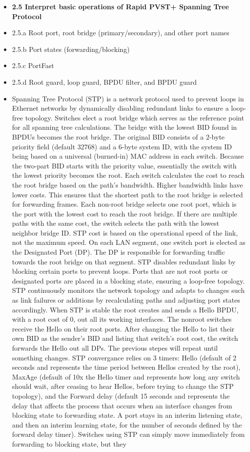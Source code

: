 \documentclass{article}
\begin{document}
\begin{itemize}
  \item \textbf{2.5 Interpret basic operations of Rapid PVST+ Spanning Tree Protocol}
  	\item 2.5.a Root port, root bridge (primary/secondary), and other port names
  	\item 2.5.b Port states (forwarding/blocking)
  	\item 2.5.c PortFast
  	\item 2.5.d Root guard, loop guard, BPDU filter, and BPDU guard
  	\item[] Spanning Tree Protocol (STP) is a network protocol used to prevent loops in Ethernet networks by dynamically disabling redundant links to ensure a loop-free topology. Switches elect a root bridge which serves as the reference point for all spanning tree calculations. The bridge with the lowest BID found in BPDUs becomes the root bridge. The original BID consists of a 2-byte priority field (default 32768) and a 6-byte system ID, with the system ID being based on a universal (burned-in) MAC address in each switch. Because the two-part BID starts with the priority value, essentially the switch with the lowest priority becomes the root. Each switch calculates the cost to reach the root bridge based on the path's bandwidth. Higher bandwidth links have lower costs. This ensures that the shortest path to the root bridge is selected for forwarding frames. Each non-root bridge selects one root port, which is the port with the lowest cost to reach the root bridge. If there are multiple paths with the same cost, the switch selects the path with the lowest neighbor bridge ID. STP cost is based on the operational speed of the link, not the maximum speed. On each LAN segment, one switch port is elected as the Designated Port (DP). The DP is responsible for forwarding traffic towards the root bridge on that segment. STP disables redundant links by blocking certain ports to prevent loops. Ports that are not root ports or designated ports are placed in a blocking state, ensuring a loop-free topology. STP continuously monitors the network topology and adapts to changes such as link failures or additions by recalculating paths and adjusting port states accordingly. When STP is stable the root creates and sends a Hello BPDU, with a root cost of 0, out all its working interfaces. The nonroot switches receive the Hello on their root ports. After changing the Hello to list their own BID as the sender's BID and listing that switch's root cost, the switch forwards the Hello out all DPs. The previous stepes will repeat until something changes. STP convergance relies on 3 timers: Hello (default of 2 seconds and represents the time period between Hellos created by the root), MaxAge (default of 10x the Hello timer and represents how long any switch should wait, after ceasing to hear Hellos, before trying to change the STP topology), and the Forward delay (default 15 seconds and represents the delay that affects the process that occurs when an interface changes from blocking state to forwarding state. A port stays in an interim listening state, and then an interim learning state, for the number of seconds defined by the forward delay timer). Switches using STP can simply move immediately from forwarding to blocking state, but they 
\end{itemize}
\end{document}
